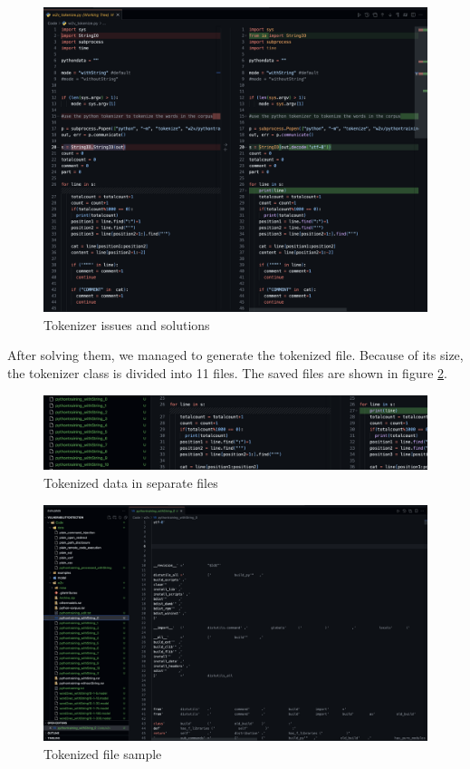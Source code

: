 \begin{figure}[!ht]
    \centering
    \includegraphics[width=1\linewidth]{pictures/tokenization_isseus.png}
    \caption{Tokenizer issues and solutions}
    \label{fig: Figure4}
\end{figure}

After solving them, we managed to generate the tokenized file. Because of its size, the tokenizer class is divided into 11 files. The saved files are shown in figure \ref{fig: Figure5}.
\begin{figure}[!ht]
    \centering
    \includegraphics[width=1\linewidth]{pictures/tokenized_data.png}
    \caption{Tokenized data in separate files}
    \label{fig: Figure5}
\end{figure}

\begin{figure}
    \centering
    \includegraphics[width=1\linewidth]{pictures/tokenized_sample.png}
    \caption{Tokenized file sample}
    \label{fig: tokenize_sample}
\end{figure}

